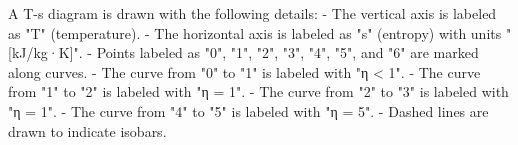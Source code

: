 A T-s diagram is drawn with the following details:  
- The vertical axis is labeled as "T" (temperature).  
- The horizontal axis is labeled as "s" (entropy) with units "[kJ/kg·K]".  
- Points labeled as "0", "1", "2", "3", "4", "5", and "6" are marked along curves.  
- The curve from "0" to "1" is labeled with "η < 1".  
- The curve from "1" to "2" is labeled with "η = 1".  
- The curve from "2" to "3" is labeled with "η = 1".  
- The curve from "4" to "5" is labeled with "η = 5".  
- Dashed lines are drawn to indicate isobars.